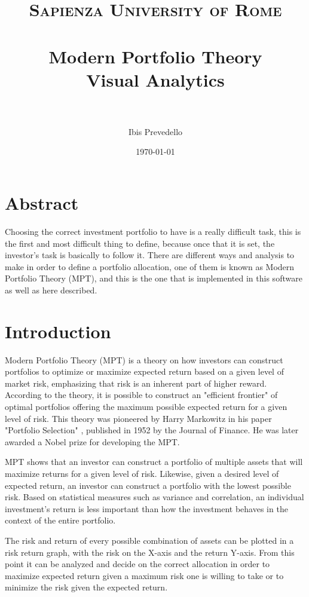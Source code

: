 \documentclass{article}
\title{
\normalfont \normalsize
\textsc{Sapienza University of Rome} \\ [25pt]
\horrule{0.5pt} \\[0.4cm] %
\LARGE Modern Portfolio Theory \\
\large Visual Analytics \\
\horrule{2pt} \\[0.5cm] %
}
\author{Ibis Prevedello}
\date{\normalsize\today}
\begin{document}
\maketitle


\section{Abstract}
Choosing the correct investment portfolio to have is a really difficult task, this is the first and most difficult thing to define, because once that it is set, the investor's task is basically to follow it.
There are different ways and analysis to make in order to define a portfolio allocation, one of them is known as Modern Portfolio Theory (MPT), and this is the one that is implemented in this software as well as here described.

\section{Introduction}
Modern Portfolio Theory (MPT) is a theory on how investors can construct portfolios to optimize or maximize expected return based on a given level of market risk, emphasizing that risk is an inherent part of higher reward. According to the theory, it is possible to construct an "efficient frontier" of optimal portfolios offering the maximum possible expected return for a given level of risk. This theory was pioneered by Harry Markowitz in his paper "Portfolio Selection" \cite{doi:10.1111/j.1540-6261.1952.tb01525.x}, published in 1952 by the Journal of Finance. He was later awarded a Nobel prize for developing the MPT.

MPT shows that an investor can construct a portfolio of multiple assets that will maximize returns for a given level of risk. Likewise, given a desired level of expected return, an investor can construct a portfolio with the lowest possible risk. Based on statistical measures such as variance and correlation, an individual investment's return is less important than how the investment behaves in the context of the entire portfolio.

The risk and return of every possible combination of assets can be plotted in a risk return graph, with the risk on the X-axis and the return Y-axis. From this point it can be analyzed and decide on the correct allocation in order to maximize expected return given a maximum risk one is willing to take or to minimize the risk given the expected return.
\end{document}
